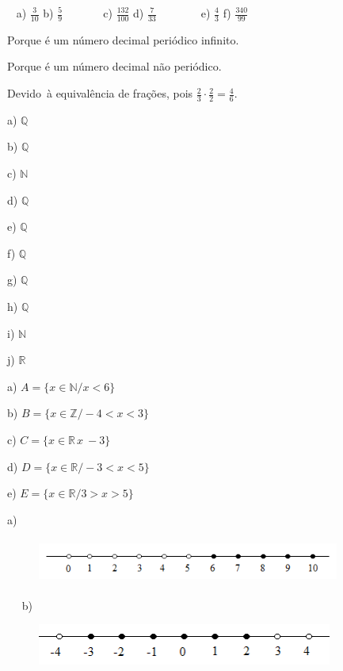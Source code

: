 \begin{respostas}{5}
	\ansitem{} ~ a)  \( \frac{3}{10} \) \quad  b)  \( \frac{5}{9} \) ~~~~~~  c)  \( \frac{132}{100} \) \quad d)  \( \frac{7}{33} \) ~~~~~ ~ e)  \( \frac{4}{3} \) \quad \quad f)  \( \frac{340}{99} \) ~~ 

	\ansitem{}Porque é um número decimal periódico infinito.

	\ansitem{}Porque é um número decimal não periódico.

	\ansitem{} Devido~à equivalência de frações, pois   \( \frac{2}{3} \cdot \frac{2}{2}=\frac{4}{6} \).
	
\begin{multicols}{10}
	
	a) \( \mathbb{Q} \)
	
	b) \( \mathbb{Q} \)
	
	c) \( \mathbb{N} \)
	
	d) \( \mathbb{Q} \)
	
	e) \( \mathbb{Q} \)
	
	f) \( \mathbb{Q} \)

	g) \( \mathbb{Q} \)
	
	h) \( \mathbb{Q} \)
	
	i) \( \mathbb{N} \)
	
	j) $\mathbb{R}$
\end{multicols}
	\ansitem{}
	a) \( A =  \{ x \in \mathbb{N}/ x < 6 \}  \) 

	b)  \( B =  \{ x \in \mathbb{Z}/ -4 < x < 3 \}  \) 

	c)  \( C =  \{ x \in \mathbb{R}\frac{}{}x~ -3 \}  \) 

	d)  \( D =  \{ x \in \mathbb{R} / -3 < x < 5 \}  \) 

	e)  \( E =  \{ x \in \mathbb{R} / 3 > x> 5 \}  \) 

	\ansitem{}
a)

\begin{figure}[H]
	\begin{Center}
		\includegraphics[width=3.92in,height=0.58in]{capitulos/conjuntos_numericos/media/image17.png}
	\end{Center}
\end{figure}

~~
 b)

\begin{figure}[H]
	\begin{Center}
		\includegraphics[width=3.83in,height=0.53in]{capitulos/conjuntos_numericos/media/image18.png}
	\end{Center}
\end{figure}


\end{respostas}
